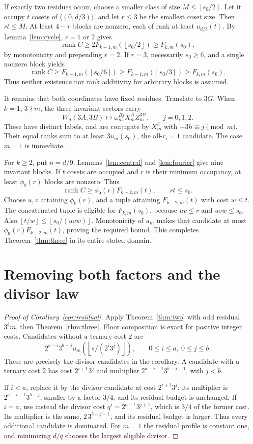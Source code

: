 \documentclass[11pt,a4paper]{article}
\theoremstyle{remark}\newtheorem{remark}[theorem]{Remark}
\DeclareMathOperator{\rank}{rank}
\newcommand{\fl}[1]{\left\lfloor #1\right\rfloor}
\begin{document}
If exactly two residues occur, choose a smaller class of size
$M\le\fl{s_0/2}$. Let it occupy $t$ cosets of $\langle(0,d/3)\rangle$,
and let $r\le3$ be the smallest coset size. Then $rt\le M$.
At least $4-r$ blocks are nonzero, each of rank at least $u_{d/3}(t)$.
By Lemma~\ref{lem:cycle}, $r=1$ or $2$ gives
\[
 \rank C\ge2F_{k-1,m}(\fl{s_0/2})\ge F_{k,m}(s_0),
\]
by monotonicity and prepending $r=2$. If $r=3$, necessarily $s_0\ge6$,
and a single nonzero block yields
\[
 \rank C\ge F_{k-1,m}(\fl{s_0/6})
          \ge F_{k-1,m}(\fl{s_0/3})\ge F_{k,m}(s_0).
\]
Thus neither existence nor rank additivity for arbitrary blocks is assumed.

It remains that both coordinates have fixed residues. Translate to $3G$.
When $k=1$, $3\nmid m$, the three invariant sectors carry
\[
 W_d(3A,3B)\mapsto\omega_m^{Bj}X_m^AZ_m^{3B},\qquad j=0,1,2 .
\]
These have distinct labels, and are conjugate by $X_m^h$ with
$-3h\equiv j\pmod m$. Their equal ranks sum to at least $3u_m(s_0)$,
the all-$r_i=1$ candidate. The case $m=1$ is immediate.

For $k\ge2$, put $n=d/9$. Lemmas~\ref{lem:central} and
\ref{lem:fourier} give nine invariant blocks. If $t$ cosets are occupied
and $r$ is their minimum occupancy, at least $\phi_9(r)$ blocks are nonzero.
Thus
\[
                   \rank C\ge\phi_9(r)F_{k-2,m}(t),\qquad rt\le s_0.
\]
Choose $u,v$ attaining $\phi_9(r)$, and a tuple attaining $F_{k-2,m}(t)$
with cost $w\le t$. The concatenated tuple is eligible for $F_{k,m}(s_0)$,
because $uv\le r$ and $uvw\le s_0$. Also
$\fl{t/w}\le\fl{s_0/(uvw)}$. Monotonicity of $u_m$ makes that candidate
at most $\phi_9(r)F_{k-2,m}(t)$, proving the required bound.
This completes Theorem~\ref{thm:three} in its entire stated domain.

\section{Removing both factors and the divisor law}
\begin{proof}[Proof of Corollary~\ref{cor:residual}]
Apply Theorem~\ref{thm:two} with odd residual $3^bm$, then
Theorem~\ref{thm:three}. Floor composition is exact for positive integer
costs. Candidates without a ternary cost $2$ are
\[
 2^{a-i}3^{b-j}u_m(\fl{s/(2^i3^j)}),\qquad
 0\le i\le a,\ 0\le j\le b .
\]
These are precisely the divisor candidates in the corollary.
A candidate with a ternary cost $2$ has cost $2^{i+1}3^j$ and multiplier
$2^{a-i+1}3^{b-j-1}$, with $j<b$.

If $i<a$, replace it by the divisor candidate at cost $2^{i+1}3^j$:
its multiplier is $2^{a-i-1}3^{b-j}$, smaller by a factor $3/4$,
and its residual budget is unchanged. If $i=a$, use instead the divisor
cost $q'=2^{a-1}3^{j+1}$, which is $3/4$ of the former cost.
Its multiplier is the same, $2\,3^{b-j-1}$, and its residual budget
is larger. Thus every additional candidate is dominated. For $m=1$
the residual profile is constant one, and minimizing $d/q$ chooses
the largest eligible divisor.
\end{proof}
\end{document}
